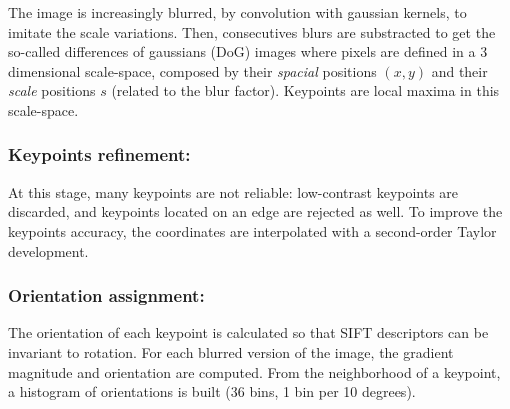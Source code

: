 \documentclass[preprint]{iucr}
\begin{document}
The image is increasingly blurred, by convolution with gaussian kernels, to
imitate the scale variations.
Then, consecutives blurs are substracted to get the so-called differences of
gaussians (DoG) images where pixels are defined in a 3 dimensional
scale-space, composed by  their \emph{spacial} positions $(x,y)$ and their
\emph{scale} positions $s$ (related to the blur factor). Keypoints are
local maxima in this scale-space.



\subsubsection{Keypoints refinement:}

At this stage, many keypoints are not reliable: low-contrast keypoints are
discarded, and keypoints located on an edge are rejected as well.
To improve the keypoints accuracy, the coordinates are interpolated with a
second-order Taylor development.


\subsubsection{Orientation assignment:}
The orientation of each keypoint is calculated  so that SIFT descriptors
can be invariant to rotation.
For each blurred version of the image, the gradient magnitude and orientation
are computed.
From the neighborhood of a keypoint, a histogram of orientations is built (36
bins, 1 bin per 10 degrees).
\end{document}
